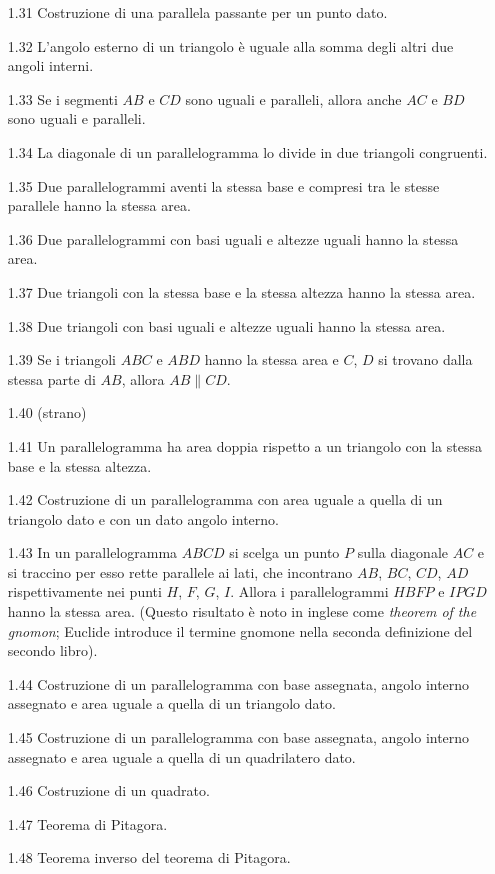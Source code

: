 \begin{enumerate}
    \item [1.31] Costruzione di una parallela passante per un punto dato. %
    \item [1.32] L'angolo esterno di un triangolo è uguale alla somma degli altri due angoli interni. %
    \item [1.33] Se i segmenti $AB$ e $CD$ sono uguali e paralleli, allora anche $AC$ e $BD$ sono uguali e paralleli. %
    \item [1.34] La diagonale di un parallelogramma lo divide in due triangoli congruenti. %
    \item [1.35] Due parallelogrammi aventi la stessa base e compresi tra le stesse parallele hanno la stessa area. %
    \item [1.36] Due parallelogrammi con basi uguali e altezze uguali hanno la stessa area. %
    \item [1.37] Due triangoli con la stessa base e la stessa altezza hanno la stessa area. %
    \item [1.38] Due triangoli con basi uguali e altezze uguali hanno la stessa area. %
    \item [1.39] Se i triangoli $ABC$ e $ABD$ hanno la stessa area e $C$, $D$ si trovano dalla stessa parte di $AB$, allora $AB \parallel CD$. %
    \item [1.40] (strano) %
    \item [1.41] Un parallelogramma ha area doppia rispetto a un triangolo con la stessa base e la stessa altezza. %
    \item [1.42] Costruzione di un parallelogramma con area uguale a quella di un triangolo dato e con un dato angolo interno. %
    \item [1.43] In un parallelogramma $ABCD$ si scelga un punto $P$ sulla diagonale $AC$ e si traccino per esso rette parallele ai lati, che incontrano $AB$, $BC$, $CD$, $AD$ rispettivamente nei punti $H$, $F$, $G$, $I$. Allora i parallelogrammi $HBFP$ e $IPGD$ hanno la stessa area. (Questo risultato è noto in inglese come \emph{theorem of the gnomon}; Euclide introduce il termine gnomone nella seconda definizione del secondo libro). %
    \item [1.44] Costruzione di un parallelogramma con base assegnata, angolo interno assegnato e area uguale a quella di un triangolo dato. %
    \item [1.45] Costruzione di un parallelogramma con base assegnata, angolo interno assegnato e area uguale a quella di un quadrilatero dato. %
    \item [1.46] Costruzione di un quadrato. %
    \item [1.47] Teorema di Pitagora. %
    \item [1.48] Teorema inverso del teorema di Pitagora. %
\end{enumerate}

%